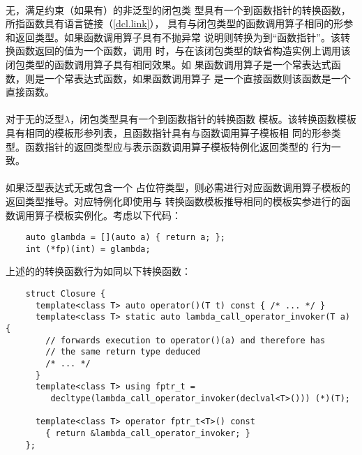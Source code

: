 \paragraph{} %
无，满足约束（如果有）的非泛型的闭包类
型具有一个到函数指针的转换函数，所指函数具有\cpp{}语言链接（\ref{dcl.link}），
具有与闭包类型的函数调用算子相同的形参和返回类型。如果函数调用算子具有不抛异常
说明则转换为到“函数指针”。该转换函数返回的值为一个函数，调用
时，与在该闭包类型的缺省构造实例上调用该闭包类型的函数调用算子具有相同效果。如
果函数调用算子是一个常表达式函数，则是一个常表达式函数，如果函数调用算子
是一个直接函数则该函数是一个直接函数。

\paragraph{} %
对于无的泛型$\lambda$，闭包类型具有一个到函数指针的转换函数
模板。该转换函数模板具有相同的模板形参列表，且函数指针具有与函数调用算子模板相
同的形参类型。函数指针的返回类型应与表示函数调用算子模板特例化返回类型的
行为一致。

\paragraph{} %
\begin{note}
  如果泛型表达式无或包含一个
  占位符类型，则必需进行对应函数调用算子模板的返回类型推导。对应特例化即使用与
  转换函数模板推导相同的模板实参进行的函数调用算子模板实例化。考虑以下代码：
  \begin{lstlisting}
    auto glambda = [](auto a) { return a; };
    int (*fp)(int) = glambda;
  \end{lstlisting}
  上述的的转换函数行为如同以下转换函数：
  \begin{lstlisting}
    struct Closure {
      template<class T> auto operator()(T t) const { /* ... */ }
      template<class T> static auto lambda_call_operator_invoker(T a) {
        // forwards execution to operator()(a) and therefore has
        // the same return type deduced
        /* ... */
      }
      template<class T> using fptr_t =
         decltype(lambda_call_operator_invoker(declval<T>())) (*)(T);

      template<class T> operator fptr_t<T>() const
        { return &lambda_call_operator_invoker; }
    };
  \end{lstlisting}
\end{note}


